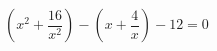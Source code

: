 \begin{ex}[type=equation]
	\begin{condition}
		\( \left( x^2+\dfrac{16}{x^2} \right)-\left( x+\dfrac{4}{x} \right)-12=0 \)
	\end{condition}
\end{ex}